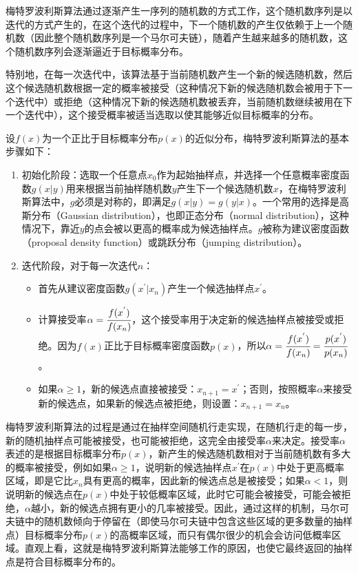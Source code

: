 梅特罗波利斯算法通过逐渐产生一序列的随机数的方式工作，这个随机数序列是以迭代的方式产生的，在这个迭代的过程中，下一个随机数的产生仅依赖于上一个随机数（因此整个随机数序列是一个马尔可夫链），随着产生越来越多的随机数，这个随机数序列会逐渐逼近于目标概率分布。

特别地，在每一次迭代中，该算法基于当前随机数产生一个新的候选随机数，然后这个候选随机数根据一定的概率被接受（这种情况下新的候选随机数会被用于下一个迭代中）或拒绝（这种情况下新的候选随机数被丢弃，当前随机数继续被用在下一个迭代中），这个接受概率被适当选取以使其能够近似目标概率的分布。

设$f(x)$为一个正比于目标概率分布$p(x)$的近似分布，梅特罗波利斯算法的基本步骤如下：

\begin{enumerate}
	\item 初始化阶段：选取一个任意点$x_0$作为起始抽样点，并选择一个任意概率密度函数$g(x|y)$用来根据当前抽样随机数$y$产生下一个候选随机数$x$，在梅特罗波利斯算法中，$g$必须是对称的，即满足$g(x|y)=g(y|x)$。一个常用的选择是高斯分布（Gaussian distribution），也即正态分布（normal distribution），这种情况下，靠近$y$的点会被以更高的概率成为候选抽样点。$g$被称为建议密度函数（proposal density function）或跳跃分布（jumping distribution）。
	\item 迭代阶段，对于每一次迭代$n$：
	\begin{itemize}
		\item 首先从建议密度函数$g(x^{'}|x_n)$产生一个候选抽样点$x^{'}$。
		\item 计算接受率$\alpha= \cfrac{f(x^{'})}{f(x_n)}$，这个接受率用于决定新的候选抽样点被接受或拒绝。因为$f(x)$正比于目标概率密度函数$p(x)$，所以$\alpha= \cfrac{f(x^{'})}{f(x_n)}= \cfrac{p(x^{'})}{p(x_n)}$。
		\item 如果$\alpha\geq 1$，新的候选点直接被接受：$x_{n+1}=x^{'}$；否则，按照概率$\alpha$来接受新的候选点，如果新的候选点被拒绝，则设置：$x_{n+1}=x_n$。
	\end{itemize}
\end{enumerate}

梅特罗波利斯算法的过程是通过在抽样空间随机行走实现，在随机行走的每一步，新的随机抽样点可能被接受，也可能被拒绝，这完全由接受率$\alpha$来决定。接受率$\alpha$表述的是根据目标概率分布$p(x)$，新产生的候选随机数相对于当前随机数有多大的概率被接受，例如如果$\alpha\geq 1$，说明新的候选抽样点$x^{'}$在$p(x)$中处于更高概率区域，即是它比$x_n$具有更高的概率，因此新的候选点总是被接受；如果$\alpha<1$，则说明新的候选点在$p(x)$中处于较低概率区域，此时它可能会被接受，可能会被拒绝，$\alpha$越小，新的候选点拥有更小的几率被接受。因此，通过这样的机制，马尔可夫链中的随机数倾向于停留在（即使马尔可夫链中包含这些区域的更多数量的抽样点）目标概率分布$p(x)$的高概率区域，而只有偶尔很少的机会会访问低概率区域。直观上看，这就是梅特罗波利斯算法能够工作的原因，也使它最终返回的抽样点是符合目标概率分布的。





